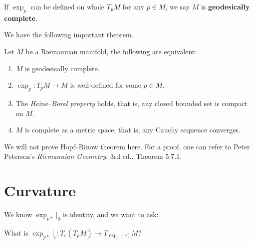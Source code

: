 \begin{defn}
    If $\exp_p$ can be defined on whole $T_pM$ for any $p\in M$, we say $M$ is \textbf{geodesically complete}.
\end{defn}

We have the following important theorem.

\begin{thm}
    Let $M$ be a Riemannian manifold, the following are equivalent:
    \begin{enumerate}[(1)]
        \item $M$ is geodesically complete.
        \item $\exp_p:T_pM\to M$ is well-defined for some $p\in M$.
        \item The \emph{Heine--Borel property} holds, that is, any closed bounded set is compact on $M$.
        \item $M$ is complete as a metric space, that is, any Cauchy sequence converges.
    \end{enumerate}
\end{thm}

We will not prove Hopf--Rinow theorem here.
For a proof, one can refer to Peter Petersen's \emph{Riemannian Geometry}, 3rd ed., Theorem 5.7.1.

\section{Curvature}\label{sect of curv}

We know $\exp_{p*}|_0$ is identity, and we want to ask:
\begin{ques}
    What is $\exp_{p*}|_v:T_v(T_pM)\to T_{\exp_{p}(v)}M$?
\end{ques}

